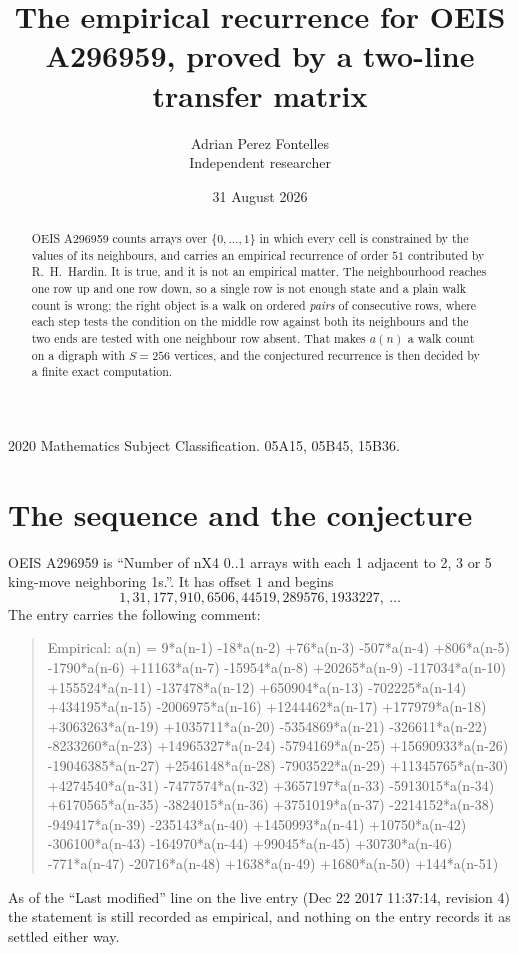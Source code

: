 \documentclass[11pt,a4paper]{article}
\title{The empirical recurrence for OEIS A296959, proved by a two-line transfer matrix}
\author{Adrian Perez Fontelles\\ \small Independent researcher}
\date{31 August 2026}
\theoremstyle{plain}
\theoremstyle{definition}
\begin{document}
\maketitle

\begin{abstract}
OEIS A296959 counts arrays over $\{0,\dots,1\}$ in which every cell is constrained by the
values of its neighbours, and carries an empirical recurrence of order $51$ contributed
by R.~H.~Hardin. It is true, and it is not an empirical matter. The neighbourhood reaches one
row up and one row down, so a single row is not enough state and a plain walk count
is wrong; the right object is a walk on ordered \emph{pairs} of consecutive rows, where
each step tests the condition on the middle row against both its neighbours and the two
ends are tested with one neighbour row absent. That makes $a(n)$ a walk count on a digraph
with $S=256$ vertices, and the conjectured recurrence is then decided by a finite exact
computation.
\end{abstract}

\noindent\small 2020 Mathematics Subject Classification. 05A15, 05B45, 15B36.\normalsize

\section{The sequence and the conjecture}

OEIS A296959 is ``Number of nX4 0..1 arrays with each 1 adjacent to 2, 3 or 5 king-move neighboring 1s.''. It has offset $1$ and begins
\[
1, 31, 177, 910, 6506, 44519, 289576, 1933227,\ \dots
\]
The entry carries the following comment:
\begin{quote}\small
Empirical: a(n) = 9*a(n-1) -18*a(n-2) +76*a(n-3) -507*a(n-4) +806*a(n-5) -1790*a(n-6) +11163*a(n-7) -15954*a(n-8) +20265*a(n-9) -117034*a(n-10) +155524*a(n-11) -137478*a(n-12) +650904*a(n-13) -702225*a(n-14) +434195*a(n-15) -2006975*a(n-16) +1244462*a(n-17) +177979*a(n-18) +3063263*a(n-19) +1035711*a(n-20) -5354869*a(n-21) -326611*a(n-22) -8233260*a(n-23) +14965327*a(n-24) -5794169*a(n-25) +15690933*a(n-26) -19046385*a(n-27) +2546148*a(n-28) -7903522*a(n-29) +11345765*a(n-30) +4274540*a(n-31) -7477574*a(n-32) +3657197*a(n-33) -5913015*a(n-34) +6170565*a(n-35) -3824015*a(n-36) +3751019*a(n-37) -2214152*a(n-38) -949417*a(n-39) -235143*a(n-40) +1450993*a(n-41) +10750*a(n-42) -306100*a(n-43) -164970*a(n-44) +99045*a(n-45) +30730*a(n-46) -771*a(n-47) -20716*a(n-48) +1638*a(n-49) +1680*a(n-50) +144*a(n-51)
\end{quote}
As of the ``Last modified'' line on the live entry (Dec 22 2017 11:37:14, revision 4) the statement is
still recorded as empirical, and nothing on the entry records it as settled either way.
\end{document}
